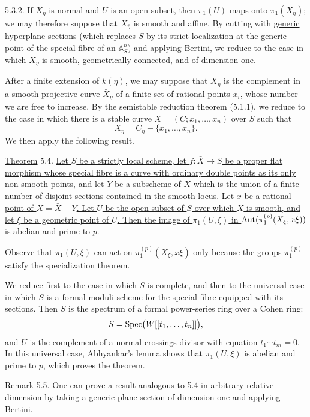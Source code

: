 5.3.2. If $X_{\bar\eta}$ is normal and $U$ is an open subset, then
$\pi_1(U)$ maps onto $\pi_1(X_{\bar\eta})$; we may therefore suppose
that $X_{\bar\eta}$ is smooth and affine. By cutting with
\underline{generic} hyperplane sections (which replaces $S$ by its
strict localization at the generic point of the special fibre of an
$\mathbb A^n_S$) and applying Bertini, we reduce to the case in which
$X_\eta$ is \underline{smooth, geometrically connected, and of
dimension one}.

After a finite extension of $k(\eta)$, we may suppose that $X_\eta$ is
the complement in a smooth projective curve $\bar X_\eta$ of a finite
set of rational points $x_i$, whose number we are free to increase. By
the semistable reduction theorem (5.1.1), we reduce to the case in which
there is a stable curve $X=(C;x_1,\ldots,x_n)$ over $S$ such that
\[
X_\eta=C_\eta-\{x_1,\ldots,x_n\}.
\]
We then apply the following result.


\underline{Theorem} 5.4. \underline{Let $S$ be a strictly local scheme,
let $f:\bar X\longrightarrow S$ be a proper flat morphism whose special
fibre is a curve with ordinary double points as its only non-smooth
points, and let $Y$ be a subscheme of $\bar X$ which is the union of a
finite number of disjoint sections contained in the smooth locus. Let
$x$ be a rational point of $X=\bar X-Y$. Let $U$ be the open subset of
$S$ over which $X$ is smooth, and let $\xi$ be a geometric point of $U$.
Then the image of $\pi_1(U,\xi)$ in
$\operatorname{Aut}(\pi_1^{(p)}(X_\xi,x\xi))$ is abelian and prime to $p$.}

Observe that $\pi_1(U,\xi)$ can act on
$\pi_1^{(p)}(X_\xi,x\xi)$ only because the groups $\pi_1^{(p)}$
satisfy the specialization theorem.

We reduce first to the case in which $S$ is complete, and then to the
universal case in which $S$ is a formal moduli scheme for the special
fibre equipped with its sections. Then $S$ is the spectrum of a formal
power-series ring over a Cohen ring:
\[
S=\operatorname{Spec}\bigl(W[[t_1,\ldots,t_n]]\bigr),
\]
and $U$ is the complement of a normal-crossings divisor with equation
$t_1\cdots t_m=0$. In this universal case, Abhyankar's lemma shows that
$\pi_1(U,\xi)$ is abelian and prime to $p$, which proves the theorem.

\underline{Remark} 5.5. One can prove a result analogous to 5.4 in
arbitrary relative dimension by taking a generic plane section of
dimension one and applying Bertini.

